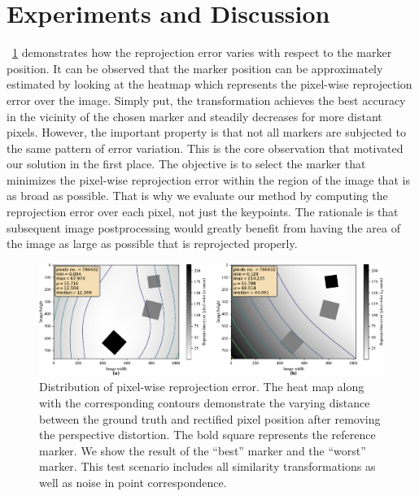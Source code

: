 \section{Experiments and Discussion}
\label{sec:HomographyExperiments}

\figstr{}~\ref{fig:HeatmapsBestWorst} demonstrates how the reprojection error varies with respect to the marker position. It can be observed that the marker position can be approximately estimated by looking at the heatmap which represents the pixel-wise reprojection error over the image. Simply put, the transformation achieves the best accuracy in the vicinity of the chosen marker and steadily decreases for more distant pixels. However, the important property is that not all markers are subjected to the same pattern of error variation. This is the core observation that motivated our solution in the first place. The objective is to select the marker that minimizes the pixel-wise reprojection error within the region of the image that is as broad as possible. That is why we evaluate our method by computing the reprojection error over each pixel, not just the keypoints. The rationale is that subsequent image postprocessing would greatly benefit from having the area of the image as large as possible that is reprojected properly.

\begin{figure}[t]
    \centerline{\includegraphics[width=\linewidth]{figures/homography/heatmaps_best_worst.pdf}}
    \caption[Homography ranking heatmaps]{Distribution of pixel-wise reprojection error. The heat map along with the corresponding contours demonstrate the varying distance between the ground truth and rectified pixel position after removing the perspective distortion. The bold square represents the reference marker. We show the result of  the ``best'' marker and  the ``worst'' marker. This test scenario includes all similarity transformations as well as noise in point correspondence.}
    \label{fig:HeatmapsBestWorst}
\end{figure}

